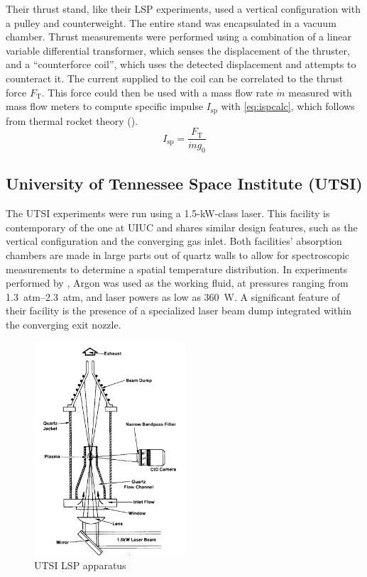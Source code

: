             Their thrust stand, like their LSP experiments, used a vertical configuration with a pulley and counterweight. The entire stand was encapsulated in a vacuum chamber. Thrust measurements were performed using  a combination of a linear variable differential transformer, which senses the displacement of the thruster, and a ``counterforce coil'', which uses the detected displacement and attempts to counteract it. The current supplied to the coil can be correlated to the thrust force $F_\text{T}$. This force could then be used with a mass flow rate $\dot{m}$ measured with mass flow meters to compute specific impulse $I_\text{sp}$ with \autoref{eq:ispcalc}, which follows from thermal rocket theory (\textcite{zandbergenAE4S01ThermalRocket2020}).
            \begin{equation}
                I_\text{sp} = \frac{F_\text{T}}{\dot{m}g_0}
                \label{eq:ispcalc}
            \end{equation}

        \subsection{University of Tennessee Space Institute (UTSI)}
            The UTSI experiments were run using a 1.5-kW-class  laser. This facility is contemporary of the one at UIUC and shares similar design features, such as the vertical configuration and the converging gas inlet. Both facilities' absorption chambers are made in large parts out of quartz walls to allow for spectroscopic measurements to determine a spatial temperature distribution. In experiments performed by \textcite{keeferPowerAbsorptionLasersustained1986}, Argon was used as the working fluid, at pressures ranging from \qtyrange{1.3}{2.3}{atm}, and laser powers as low as 360~W. A significant feature of their facility is the presence of a specialized laser beam dump integrated within the converging exit nozzle.

            \begin{figure}[h]
                \centering
                \includegraphics[width=0.5\textwidth]{assets/2 background/utsi_facility.png}
                \caption[UTSI LSP apparatus]{UTSI LSP apparatus \cite{keeferPowerAbsorptionLasersustained1986}}
                \label{fig:4_utsiExp}
            \end{figure}

